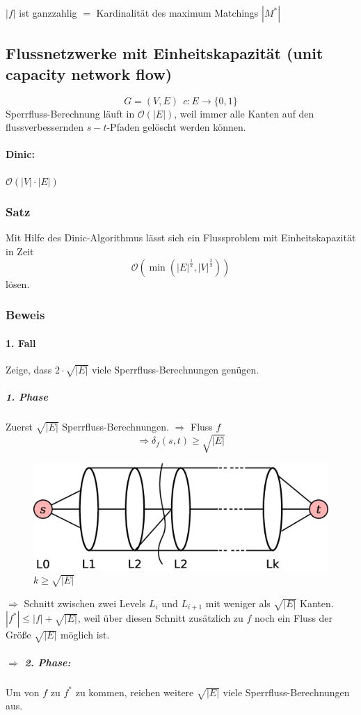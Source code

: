 $|f|$ ist ganzzahlig $=$ Kardinalität des maximum Matchings $|M^*|$
\subsection[Flussnetzwerke mit Einheitskapazität]{Flussnetzwerke mit Einheitskapazität (unit capacity network flow)}
\[ G=(V,E)~~c:E\rightarrow\{0,1\} \]
Sperrfluss-Berechnung läuft in $\mathcal{O}(|E|)$, weil immer alle Kanten auf den flussverbessernden $s-t$-Pfaden gelöscht werden können.
\paragraph{Dinic:} $\mathcal{O}(|V|\cdot|E|)$
\subsubsection{Satz}
Mit Hilfe des Dinic-Algorithmus lässt sich ein Flussproblem mit Einheitskapazität in Zeit 
\[ \mathcal{O}\left( \min\left( |E|^\frac{1}{2},|V|^\frac{2}{3} \right) \right) \]
lösen.
\subsubsection{Beweis}
\paragraph{1. Fall}
Zeige, dass $2\cdot\sqrt{|E|}$ viele Sperrfluss-Berechnungen genügen.
\subparagraph{1. Phase} Zuerst $\sqrt{|E|}$ Sperrfluss-Berechnungen. $\Rightarrow$ Fluss $f$ 
\[ \Rightarrow\delta_f(s,t)\geq \sqrt{|E|} \]
\begin{figure}[h]
\centering
\includegraphics[width=0.7\linewidth]{27/Grafik/Diagramm6}
\caption{$k\geq \sqrt{|E|}$}
\label{fig:Diagramm6}
\end{figure}
$\Rightarrow$ Schnitt zwischen zwei Levels $L_i$ und $L_{i+1}$ mit weniger als $\sqrt{|E|}$ Kanten.\\
$|f^*| \leq |f| +\sqrt{|E|}$, weil über diesen Schnitt zusätzlich zu $f$ noch ein Fluss der Größe $\sqrt{|E|}$ möglich ist.\\
\subparagraph{$\Rightarrow$ 2. Phase:}
Um von $f$ zu $f^*$ zu kommen, reichen weitere $\sqrt{|E|}$ viele Sperrfluss-Berechnungen aus.